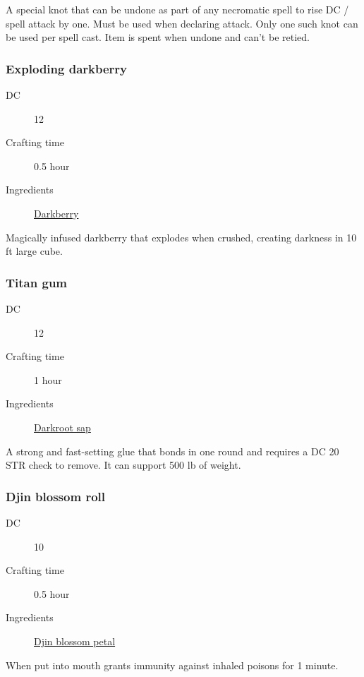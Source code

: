 A special knot that can be undone as part of any necromatic spell to rise DC / spell attack by one. Must be used when declaring attack. 
Only one such knot can be used per spell cast. Item is spent when undone and can't be retied.

\subsubsection{Exploding darkberry}
\label{Exploding darkberry}

\begin{description}
\item [DC] 12
\item [Crafting time] 0.5 hour
\item [Ingredients] \hyperref[Darkberry]{Darkberry}
\end{description}

Magically infused darkberry that explodes when crushed, creating darkness in 10 ft large cube.

\subsubsection{Titan gum}
\label{Titan gum}

\begin{description}
\item [DC] 12
\item [Crafting time] 1 hour
\item [Ingredients] \hyperref[Darkroot]{Darkroot sap}
\end{description}

A strong and fast-setting glue that bonds in one round and 
requires a DC 20 STR check to remove. It can support 500 lb of weight.

\subsubsection{Djin blossom roll}
\label{Djin blossom roll}

\begin{description}
\item [DC] 10
\item [Crafting time] 0.5 hour
\item [Ingredients] \hyperref[Djin Blossom]{Djin blossom petal}
\end{description}

When put into mouth grants immunity against inhaled poisons for 1 minute.

